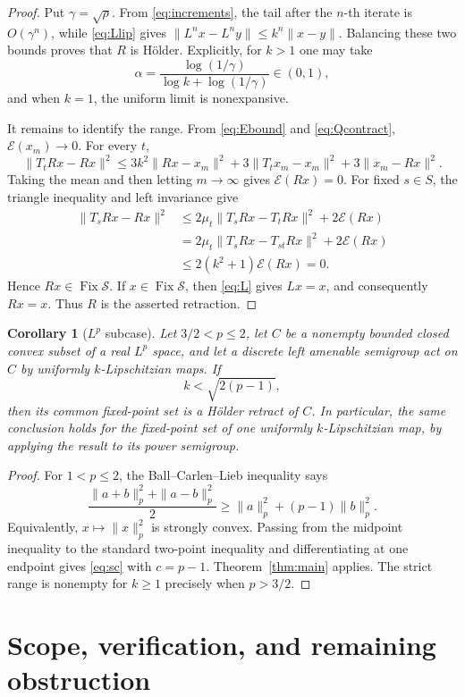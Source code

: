 \documentclass[11pt]{article}
\newtheorem{corollary}[theorem]{Corollary}
\newcommand{\Fix}{\operatorname{Fix}}
\newcommand{\E}{\mathcal E}
\begin{document}
\begin{proof}
Put $\gamma=\sqrt\rho$.  From \eqref{eq:increments}, the tail after the
$n$-th iterate is $O(\gamma^n)$, while \eqref{eq:Llip} gives
$\|L^nx-L^ny\|\le k^n\|x-y\|$.  Balancing these two bounds proves that $R$
is H\"older.  Explicitly, for $k>1$ one may take
\begin{equation}\label{eq:alpha}
 \alpha=\frac{\log(1/\gamma)}{\log k+\log(1/\gamma)}\in(0,1),
\end{equation}
and when $k=1$, the uniform limit is nonexpansive.

It remains to identify the range.  From \eqref{eq:Ebound} and
\eqref{eq:Qcontract}, $\E(x_m)\to0$.  For every $t$,
\[
 \|T_tRx-Rx\|^2
 \le3k^2\|Rx-x_m\|^2+3\|T_tx_m-x_m\|^2
       +3\|x_m-Rx\|^2.
\]
Taking the mean and then letting $m\to\infty$ gives $\E(Rx)=0$.  For fixed
$s\in S$, the triangle inequality and left invariance give
\begin{align*}
 \|T_sRx-Rx\|^2
 &\le2\mu_t\|T_sRx-T_tRx\|^2+2\E(Rx)\\
 &=2\mu_t\|T_sRx-T_{st}Rx\|^2+2\E(Rx)\\
 &\le2(k^2+1)\E(Rx)=0.
\end{align*}
Hence $Rx\in\Fix\mathcal S$.  If $x\in\Fix\mathcal S$, then \eqref{eq:L}
gives $Lx=x$, and consequently $Rx=x$.  Thus $R$ is the asserted retraction.
\end{proof}

\begin{corollary}[$L^p$ subcase]\label{cor:lp}
Let $3/2<p\le2$, let $C$ be a nonempty bounded closed convex subset of a real
$L^p$ space, and let a discrete left amenable semigroup act on $C$ by
uniformly $k$-Lipschitzian maps.  If
\[
 k<\sqrt{2(p-1)},
\]
then its common fixed-point set is a H\"older retract of $C$.  In particular,
the same conclusion holds for the fixed-point set of one uniformly
$k$-Lipschitzian map, by applying the result to its power semigroup.
\end{corollary}

\begin{proof}
For $1<p\le2$, the Ball--Carlen--Lieb inequality says
\[
 \frac{\|a+b\|_p^2+\|a-b\|_p^2}{2}
 \ge \|a\|_p^2+(p-1)\|b\|_p^2.
\]
Equivalently, $x\mapsto\|x\|_p^2$ is strongly convex.  Passing from the
midpoint inequality to the standard two-point inequality and differentiating
at one endpoint gives \eqref{eq:sc} with $c=p-1$.  Theorem~\ref{thm:main}
applies.  The strict range is nonempty for $k\ge1$ precisely when $p>3/2$.
\end{proof}

\section*{Scope, verification, and remaining obstruction}
\end{document}
